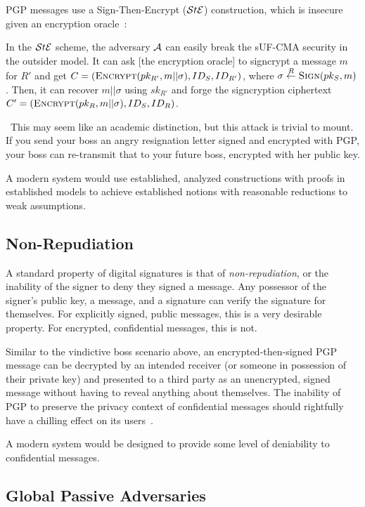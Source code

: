 PGP messages use a Sign-Then-Encrypt ($\mathcal{S}t\mathcal{E}$) construction, which is insecure given an encryption
oracle~\cite[p. 41]{an2010}:

\begin{displayquote}
    In the $\mathcal{S}t\mathcal{E}$ scheme, the adversary $\mathcal{A}$ can easily break the sUF-CMA security in the outsider model.
    It can ask [the encryption oracle] to signcrypt a message $m$ for $R'$ and get
    $C=(\textsc{Encrypt}(pk_{R'},m||\sigma),ID_S,ID_{R'})$, where $\sigma \stackrel{R}{\gets} \textsc{Sign}(pk_S,m)$.
    Then, it can recover $m||\sigma$ using $sk_{R'}$ and forge the signcryption ciphertext
    $C' = (\textsc{Encrypt}(pk_R,m||\sigma),ID_S,ID_R)$.
\end{displayquote}

~This may seem like an academic distinction, but this attack is trivial to mount.
If you send your boss an angry resignation letter signed and encrypted with PGP, your boss can re-transmit that to your
future boss, encrypted with her public key.

A modern system would use established, analyzed constructions with proofs in established models to achieve established
notions with reasonable reductions to weak assumptions.

\subsection{Non-Repudiation}\label{subsec:non-repudiation}

A standard property of digital signatures is that of \emph{non-repudiation}, or the inability of the signer to deny they
signed a message.
Any possessor of the signer's public key, a message, and a signature can verify the signature for themselves.
For explicitly signed, public messages, this is a very desirable property.
For encrypted, confidential messages, this is not.

Similar to the vindictive boss scenario above, an encrypted-then-signed PGP message can be decrypted by an intended
receiver (or someone in possession of their private key) and presented to a third party as an unencrypted, signed
message without having to reveal anything about themselves.
The inability of PGP to preserve the privacy context of confidential messages should rightfully have a chilling effect
on its users~\cite{borisov2004}.

A modern system would be designed to provide some level of deniability to confidential messages.

\subsection{Global Passive Adversaries}\label{subsec:global-passive-adversaries}

